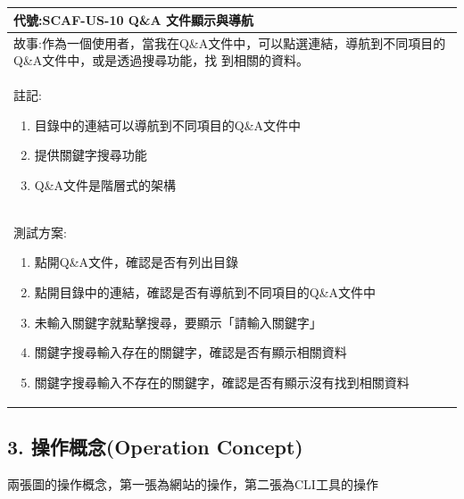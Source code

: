 \documentclass{report}
\begin{document}
\subsection*{}
\fontsize{12}{20}\selectfont
\begin{tabularx}{\textwidth}{|X|}
  \hline
  代號:SCAF-US-10 Q\&A 文件顯示與導航 \\
  \hline
  故事:作為一個使用者，當我在Q\&A文件中，可以點選連結，導航到不同項目的Q\&A文件中，或是透過搜尋功能，找
  到相關的資料。 \\
  \hline
  註記:
  \begin{enumerate}
    \item 目錄中的連結可以導航到不同項目的Q\&A文件中
    \item 提供關鍵字搜尋功能
    \item Q\&A文件是階層式的架構
  \end{enumerate} \\
  \hline
  測試方案:
  \begin{enumerate}
    \item 點開Q\&A文件，確認是否有列出目錄
    \item 點開目錄中的連結，確認是否有導航到不同項目的Q\&A文件中
    \item 未輸入關鍵字就點擊搜尋，要顯示「請輸入關鍵字」
    \item 關鍵字搜尋輸入存在的關鍵字，確認是否有顯示相關資料
    \item 關鍵字搜尋輸入不存在的關鍵字，確認是否有顯示沒有找到相關資料
  \end{enumerate} \\
  \hline
\end{tabularx}


\subsection*{3. 操作概念(Operation
 Concept)}

兩張圖的操作概念，第一張為網站的操作，第二張為CLI工具的操作
\end{document}
